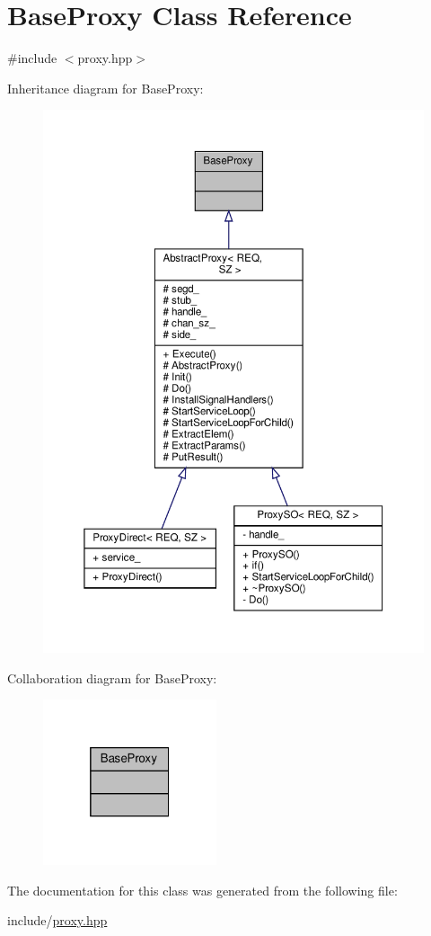 \hypertarget{classBaseProxy}{}\section{Base\+Proxy Class Reference}
\label{classBaseProxy}


{\ttfamily \#include $<$proxy.\+hpp$>$}



Inheritance diagram for Base\+Proxy\+:
\nopagebreak
\begin{figure}[H]
\begin{center}
\leavevmode
\includegraphics[width=350pt]{classBaseProxy__inherit__graph}
\end{center}
\end{figure}


Collaboration diagram for Base\+Proxy\+:
\nopagebreak
\begin{figure}[H]
\begin{center}
\leavevmode
\includegraphics[width=145pt]{classBaseProxy__coll__graph}
\end{center}
\end{figure}


The documentation for this class was generated from the following file\+:\begin{DoxyCompactItemize}
\item 
include/\hyperlink{proxy_8hpp}{proxy.\+hpp}\end{DoxyCompactItemize}

